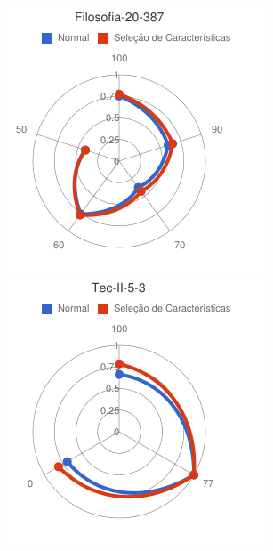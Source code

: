 \begin{figure}
\begin{minipage}{.3\textwidth}
\end{minipage} %
\begin{minipage}{.3\textwidth}
  \centering
  \includegraphics[width=\linewidth]{img/red-ufes-moodle/image9.png}
\end{minipage}
\begin{minipage}{.3\textwidth}
  \centering
  \includegraphics[width=\linewidth]{img/red-ufes-moodle/image10.png}

\end{minipage}
\end{figure}
